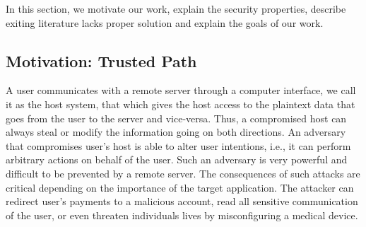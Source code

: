 
\fi


In this section, we motivate our work, explain the security properties, describe exiting literature lacks proper solution and explain the goals of our work.

\subsection{Motivation: Trusted Path}


A user communicates with a remote server through a computer interface, we call it as the host system, that which gives the host access to the plaintext data that goes from the user to the server and vice-versa. Thus, a compromised host can always steal or modify the information going on both directions. An adversary that compromises user's host is able to alter user intentions, i.e., it can perform arbitrary actions on behalf of the user. Such an adversary is very powerful and difficult to be prevented by a remote server. The consequences of such attacks are critical depending on the importance of the target application. The attacker can redirect user's payments to a malicious account, read all sensitive communication of the user, or even threaten individuals lives by misconfiguring a medical device. 


